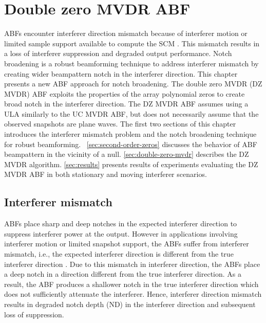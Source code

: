 \chapter{Double zero MVDR ABF}%
\label{ch:dzmvdr}
ABFs encounter interferer direction mismatch because of interferer
motion or limited sample support available to compute the SCM
\cite{vtree2002oap}. This mismatch results in a loss of interferer
suppression and degraded output performance. Notch broadening is a
robust beamforming technique to address interferer mismatch by
creating wider beampattern notch in the interferer direction. This
chapter presents a new ABF approach for notch broadening. The double
zero MVDR (DZ MVDR) ABF exploits the properties of the array
polynomial zeros to create broad notch in the interferer
direction. The DZ MVDR ABF assumes using a ULA similarly to the UC
MVDR ABF, but does not necessarily assume that the observed snapshots are
plane waves. The first two sections of this chapter introduces the
interferer mismatch problem and the notch broadening technique for
robust beamforming. \sect{}~\ref{sec:second-order-zeros} discusses the
behavior of ABF beampattern in the vicinity of a null.
\sect{}\ref{sec:double-zero-mvdr} describes the DZ MVDR
algorithm. \sect{}\ref{sec:results} presents results of experiments
evaluating the DZ MVDR ABF in both stationary and moving interferer
scenarios. 

\section{Interferer mismatch}
\label{sec:interferer-mismatch}
ABFs place sharp and deep notches in the expected interferer direction
to suppress interferer power at the output. However in applications
involving interferer motion or limited snapshot support, the ABFs
suffer from interferer mismatch, i.e., the expected interferer
direction is different from the true interferer direction
\cite{vtree2002oap, riba1997comm, baggeroer1999passive}. Due to this
mismatch in interferer direction, the ABFs place a deep notch in a
direction different from the true interferer direction. As a result,
the ABF produces a shallower notch in the true interferer direction
which does not sufficiently attenuate the interferer. Hence,
interferer direction mismatch results in degraded notch depth (ND) in
the interferer direction and subsequent loss of suppression.

